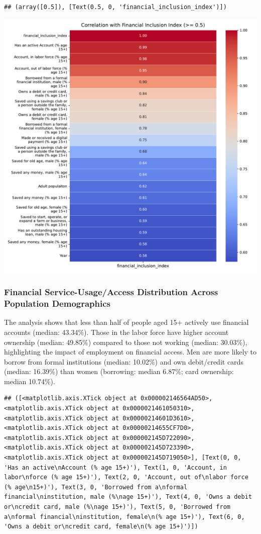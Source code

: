 \documentclass[preprint, 3p,
authoryear]{elsarticle} %
\begin{document}
\begin{verbatim}
## (array([0.5]), [Text(0.5, 0, 'financial_inclusion_index')])
\end{verbatim}

\begin{center}\includegraphics[width=0.8\linewidth]{Final-Report_files/figure-latex/unnamed-chunk-20-13} \end{center}

\subsubsection{Financial Service-Usage/Access Distribution Across
Population
Demographics}\label{financial-service-usageaccess-distribution-across-population-demographics}

The analysis shows that less than half of people aged 15+ actively use
financial accounts (median: 43.34\%). Those in the labor force have
higher account ownership (median: 49.85\%) compared to those not working
(median: 30.03\%), highlighting the impact of employment on financial
access. Men are more likely to borrow from formal institutions (median:
10.02\%) and own debit/credit cards (median: 16.39\%) than women
(borrowing: median 6.87\%; card ownership: median 10.74\%).

\begin{verbatim}
## ([<matplotlib.axis.XTick object at 0x000002146564AD50>, <matplotlib.axis.XTick object at 0x0000021461050310>, <matplotlib.axis.XTick object at 0x00000214601D3610>, <matplotlib.axis.XTick object at 0x00000214655CF7D0>, <matplotlib.axis.XTick object at 0x000002145D722090>, <matplotlib.axis.XTick object at 0x000002145D723390>, <matplotlib.axis.XTick object at 0x000002145D719050>], [Text(0, 0, 'Has an active\nAccount (% age 15+)'), Text(1, 0, 'Account, in labor\nforce (% age 15+)'), Text(2, 0, 'Account, out of\nlabor force (% age\n15+)'), Text(3, 0, 'Borrowed from a\nformal financial\ninstitution, male (%\nage 15+)'), Text(4, 0, 'Owns a debit or\ncredit card, male (%\nage 15+)'), Text(5, 0, 'Borrowed from a\nformal financial\ninstitution, female\n(% age 15+)'), Text(6, 0, 'Owns a debit or\ncredit card, female\n(% age 15+)')])
\end{verbatim}
\end{document}
